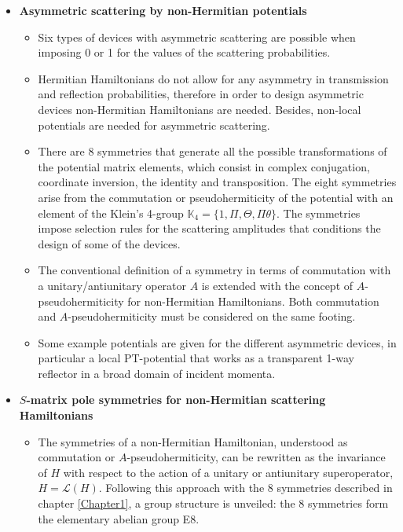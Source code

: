 \begin{itemize}
  \item {\bf Asymmetric scattering by non-Hermitian potentials}
  \begin{itemize}
    \item Six types of devices with asymmetric scattering are possible when imposing 0 or 1 for the values of the scattering probabilities.

    \item Hermitian Hamiltonians do not allow for any asymmetry in transmission and
    reflection probabilities, therefore in order to design asymmetric devices non-Hermitian
    Hamiltonians are needed. Besides, non-local potentials are needed for asymmetric scattering.

    \item There are 8 symmetries that generate all the possible transformations of the potential matrix elements, which consist in complex conjugation, coordinate inversion, the identity and transposition. The eight symmetries arise from the commutation or pseudohermiticity of the potential with an element of the Klein’s 4-group $\mathbb{K}_4 = \{1,\Pi,\Theta,\Pi\theta\}$. The symmetries impose selection rules for the scattering amplitudes that conditions the design of some of the devices.

    \item The conventional definition of a symmetry in terms of commutation with a unitary/antiunitary operator $A$ is extended with the concept of $A$-pseudohermiticity for non-Hermitian Hamiltonians. Both commutation and $A$-pseudohermiticity must be considered on the same footing.

    \item Some example potentials are given for the different asymmetric devices, in particular a local PT-potential that works as a transparent 1-way reflector in a broad domain of incident momenta.

  \end{itemize}

  \item {\bf $S$-matrix pole symmetries for non-Hermitian scattering Hamiltonians}
  \begin{itemize}
    \item The symmetries of a non-Hermitian Hamiltonian, understood as commutation or $A$-pseudohermiticity, can be rewritten as the invariance of $H$ with respect to the action of a unitary or antiunitary superoperator, $H = \mathcal{L}(H)$. Following this approach with the 8 symmetries described in chapter \ref{Chapter1}, a group structure is unveiled: the 8 symmetries form the elementary abelian group E8.


\end{itemize}
\end{itemize}

